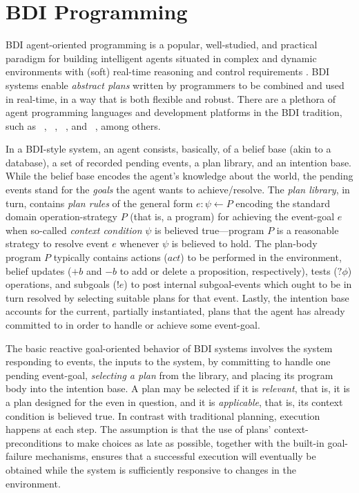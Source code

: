 \section{BDI Programming}\label{sec:preliminaries}

BDI agent-oriented programming is a popular, well-studied, and practical paradigm for
building intelligent agents situated in complex and dynamic environments with
(soft) real-time reasoning and control requirements \cite{Georgeff89-PRS}.
%
BDI systems enable \emph{abstract plans} written by programmers to be combined and used in
real-time, in a way that is both flexible and robust. 
%
There are a plethora of agent programming languages and development
platforms in the BDI tradition, such as  \PRS\ \cite{Georgeff89-PRS},
\JACK~\cite{BRHL98}, \TAPL~\cite{Hindriks99:Agent}, and \JASON~\cite{jasonbook}, among others.


In a BDI-style system, an agent consists, basically, of a belief base (akin
to a database), a set of recorded pending events, a plan library, and an
intention base. While the belief base encodes the agent's knowledge about the world, the
pending events stand for the \emph{goals} the agent wants to achieve/resolve. 
%
The \textit{plan library}, in turn, contains \emph{plan rules} of the general 
form $e: \psi \leftarrow P$ encoding the standard domain operation-strategy $P$
(that is, a program) for achieving the event-goal $e$ when so-called \textit{context condition}
$\psi$ is believed true---program $P$ is a reasonable strategy to resolve event $e$ whenever $\psi$
is believed to hold.
%
The plan-body program $P$ typically contains actions ($act$) to be performed in the environment,
belief updates ($+b$ and $-b$ to add or delete a proposition, respectively), tests ($?\phi$)
operations, and subgoals ($!e$) to post internal subgoal-events which ought to be in turn resolved
by selecting suitable plans for that event.
%
Lastly, the intention base accounts for the current, partially instantiated, plans
that the agent has already committed to in order to handle or achieve some event-goal.


The basic reactive goal-oriented behavior of BDI systems involves the system responding to
events, the inputs to the system, by committing to handle one pending event-goal, \textit{selecting
a plan} from the library, and placing its program body  into the intention base.
%
A plan may be selected if it is \textit{relevant}, that is, it is a plan designed for the even in
question, and it is \emph{applicable}, that is, its context condition is believed true.
%
In contrast with traditional planning, execution happens at each step. The assumption is that
the use of plans' context-preconditions to make choices as late as possible, together with
the built-in goal-failure mechanisms, ensures that a successful execution will eventually be
obtained while the system is sufficiently responsive to changes in the environment.


